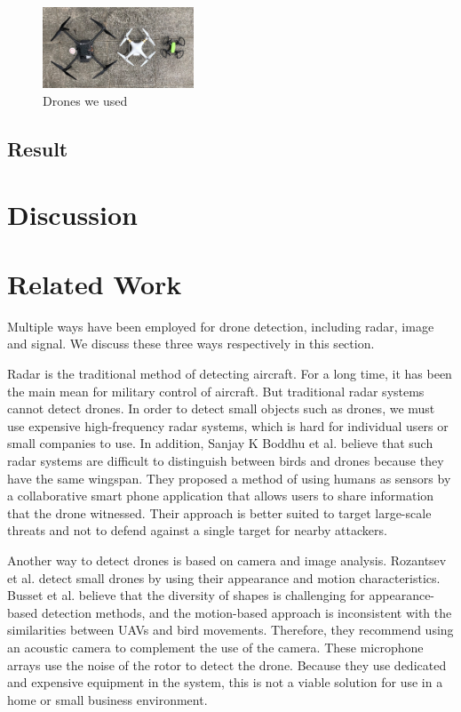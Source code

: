 \documentclass{sig-alternate-10pt}
\begin{document}
\begin{figure}[h]
	\centering
	\includegraphics[width=0.4\textwidth]{pics/drones.png}
	\caption{Drones we used}
	\label{drones}
\end{figure}

\subsection{Result}



\section{Discussion}


\section{Related Work}
Multiple ways have been employed for drone detection, including radar, image and signal. We discuss these three ways respectively in this section.

\hspace{1mm} 
Radar is the traditional method of detecting aircraft. For a long time, it has been the main mean for military control of aircraft. But traditional radar systems cannot detect drones. In order to detect small objects such as drones, we must use expensive high-frequency radar systems, which is hard for individual users or small companies to use. In addition, Sanjay K Boddhu et al. believe that such radar systems are difficult to distinguish between birds and drones because they have the same wingspan. They proposed a method of using humans as sensors by a collaborative smart phone application that allows users to share information that the drone witnessed. Their approach is better suited to target large-scale threats and not to defend against a single target for nearby attackers.

\hspace{1mm} 
Another way to detect drones is based on camera and image analysis. Rozantsev et al. detect small drones by using their appearance and motion characteristics. Busset et al. believe that the diversity of  shapes is challenging for appearance-based detection methods, and the motion-based approach is inconsistent with the similarities between UAVs and bird movements. Therefore, they recommend using an acoustic camera to complement the use of the camera. These microphone arrays use the noise of the rotor to detect the drone. Because they use dedicated and expensive equipment in the system, this is not a viable solution for use in a home or small business environment.
\end{document}
